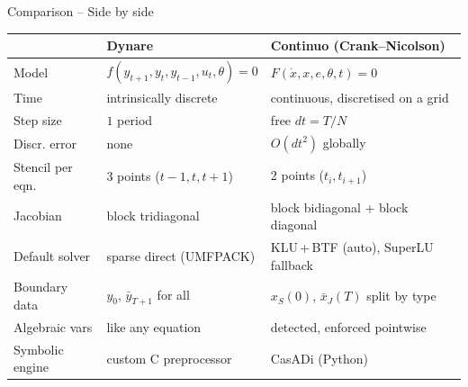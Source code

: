 \documentclass[11pt,aspectratio=169]{beamer}
\begin{document}
\begin{frame}{Comparison -- Side by side}

\begin{center}
\scriptsize
\renewcommand{\arraystretch}{1.2}
\begin{tabular}{p{3.4cm}p{4.4cm}p{4.4cm}}
  \toprule
   & \textbf{Dynare} & \textbf{Continuo (Crank--Nicolson)} \\
  \midrule
  Model       & $f(y_{t+1},y_t,y_{t-1},u_t,\theta)=0$ &
                $F(\dot x, x, e, \theta, t)=0$ \\
  Time        & intrinsically discrete & continuous, discretised on a grid \\
  Step size   & $1$ period & free $dt = T/N$ \\
  Discr. error & none & $O(dt^2)$ globally \\
  Stencil per eqn. & 3 points ($t{-}1,t,t{+}1$) & 2 points ($t_i,t_{i+1}$) \\
  Jacobian & block tridiagonal & block bidiagonal + block diagonal \\
  Default solver & sparse direct (UMFPACK) & KLU\,+\,BTF (auto), SuperLU fallback \\
  Boundary data & $y_0$, $\bar y_{T+1}$ for all & $x_S(0)$, $\bar x_J(T)$ split by type \\
  Algebraic vars & like any equation & detected, enforced pointwise \\
  Symbolic engine & custom C preprocessor & CasADi (Python) \\
  \bottomrule
\end{tabular}
\end{center}

\end{frame}
\end{document}
